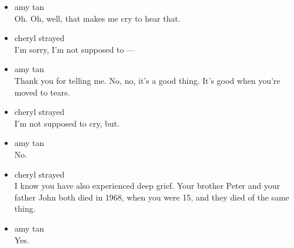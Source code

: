 \begin{itemize}
\item
  amy tan\\
  Oh. Oh, well, that makes me cry to hear that.
\item
  cheryl strayed\\
  I'm sorry, I'm not supposed to ---
\item
  amy tan\\
  Thank you for telling me. No, no, it's a good thing. It's good when
  you're moved to tears.
\item
  cheryl strayed\\
  I'm not supposed to cry, but.
\item
  amy tan\\
  No.
\item
  cheryl strayed\\
  I know you have also experienced deep grief. Your brother Peter and
  your father John both died in 1968, when you were 15, and they died of
  the same thing.
\item
  amy tan\\
  Yes.


\end{itemize}
